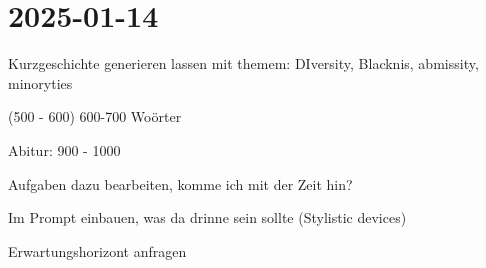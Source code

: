 \section{2025-01-14}

Kurzgeschichte generieren lassen mit themem: DIversity, Blacknis, abmissity, minoryties

(500 - 600)
600-700 Woörter

Abitur: 900 - 1000

Aufgaben dazu bearbeiten, komme ich mit der Zeit hin?

Im Prompt einbauen, was da drinne sein sollte (Stylistic devices)

Erwartungshorizont anfragen
